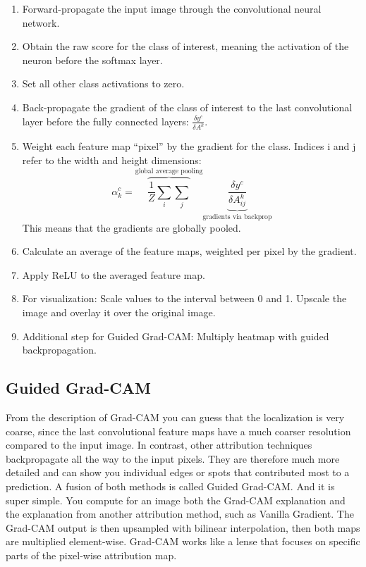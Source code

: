 \documentclass[
  10pt,
]{scrbook}
\providecommand{\tightlist}{%
  \setlength{\itemsep}{0pt}\setlength{\parskip}{0pt}}
\begin{document}
\begin{enumerate}
\def\labelenumi{\arabic{enumi}.}
\tightlist
\item
  Forward-propagate the input image through the convolutional neural network.
\item
  Obtain the raw score for the class of interest, meaning the activation of the neuron before the softmax layer.
\item
  Set all other class activations to zero.
\item
  Back-propagate the gradient of the class of interest to the last convolutional layer before the fully connected layers: \(\frac{\delta{}y^c}{\delta{}A^k}\).
\item
  Weight each feature map ``pixel'' by the gradient for the class. Indices i and j refer to the width and height dimensions:
  \[\alpha_k^c = \overbrace{\frac{1}{Z}\sum_{i}\sum_{j}}^{\text{global average pooling}} \underbrace{\frac{\delta y^c}{\delta A_{ij}^k}}_{\text{gradients via backprop}}\]
  This means that the gradients are globally pooled.
\item
  Calculate an average of the feature maps, weighted per pixel by the gradient.
\item
  Apply ReLU to the averaged feature map.
\item
  For visualization: Scale values to the interval between 0 and 1. Upscale the image and overlay it over the original image.
\item
  Additional step for Guided Grad-CAM: Multiply heatmap with guided backpropagation.
\end{enumerate}

\hypertarget{guided-grad-cam}{%
\subsection{Guided Grad-CAM}\label{guided-grad-cam}}

From the description of Grad-CAM you can guess that the localization is very coarse, since the last convolutional feature maps have a much coarser resolution compared to the input image.
In contrast, other attribution techniques backpropagate all the way to the input pixels.
They are therefore much more detailed and can show you individual edges or spots that contributed most to a prediction.
A fusion of both methods is called Guided Grad-CAM.
And it is super simple.
You compute for an image both the Grad-CAM explanation and the explanation from another attribution method, such as Vanilla Gradient.
The Grad-CAM output is then upsampled with bilinear interpolation, then both maps are multiplied element-wise.
Grad-CAM works like a lense that focuses on specific parts of the pixel-wise attribution map.
\end{document}
